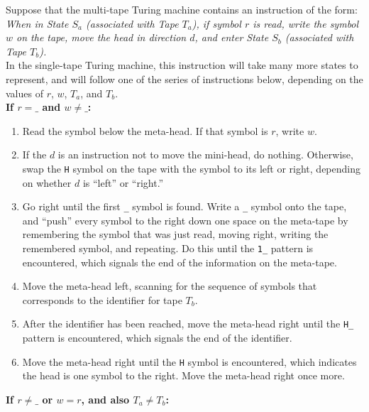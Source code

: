 \documentclass{report}
\begin{document}
Suppose that the multi-tape Turing machine contains an instruction of the form: \\

\emph{When in State $S_a$ (associated with Tape $T_a$), if symbol $r$ is read, write the symbol $w$ on the tape, move the head in direction $d$, and enter State $S_b$ (associated with Tape $T_b$).} \\

In the single-tape Turing machine, this instruction will take many more states to represent, and will follow one of the series of instructions below, depending on the values of $r$, $w$, $T_a$, and $T_b$. \\

\textbf{If $r = \texttt{\_}$ and $w \not= \texttt{\_}$:}

\begin{enumerate}

\item Read the symbol below the meta-head. If that symbol is $r$, write $w$.
\item If the $d$ is an instruction not to move the mini-head, do nothing. Otherwise, swap the \texttt{H} symbol on the tape with the symbol to its left or right, depending on whether $d$ is ``left'' or ``right.''
\item Go right until the first \texttt{\_} symbol is found. Write a \texttt{\_} symbol onto the tape, and ``push'' every symbol to the right down one space on the meta-tape by remembering the symbol that was just read, moving right, writing the remembered symbol, and repeating. Do this until the \texttt{1\_} pattern is encountered, which signals the end of the information on the meta-tape.
\item Move the meta-head left, scanning for the sequence of symbols that corresponds to the identifier for tape $T_b$.
\item After the identifier has been reached, move the meta-head right until the \texttt{H\_} pattern is encountered, which signals the end of the identifier.
\item Move the meta-head right until the \texttt{H} symbol is encountered, which indicates the head is one symbol to the right. Move the meta-head right once more.

\end{enumerate}

\textbf{If $r \not= \texttt{\_}$ or $w = r$, and also $T_a \not= T_b$:}
\end{document}
